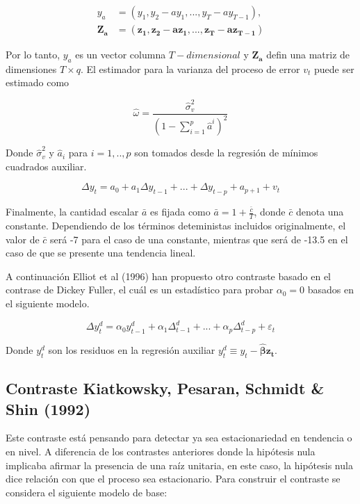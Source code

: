 \documentclass[12pt, twoside]{book}\usepackage[]{graphicx}\usepackage[]{color}
\numberwithin{equation}{section}
\numberwithin{theorem}{section}
\numberwithin{teorema}{section}
\numberwithin{defi}{section}
\numberwithin{prop}{section}
\numberwithin{defi}{section}
\theoremstyle{plain}
\begin{document}
\begin{align}
y_{a} & = (y_{1}, y_{2}-a y_{1},...,y_{T}-ay_{T-1}), \\
\boldsymbol{Z_{a}} & = (\boldsymbol{z_{1},z_{2}-a z_{1},..., z_{T}-a z_{T-1}})
\end{align}

Por lo tanto, $y_{a}$ es un vector columna $T-dimensional$ y $\boldsymbol{Z_{a}}$ defin una matriz de dimensiones $T\times q$. El estimador para la varianza del proceso de error $v_{t}$ puede ser estimado como 

\begin{equation}
\hat{\omega} = \frac{\hat{\sigma}^{2}_{v}}{(1-\sum_{i=1}^{p}\hat{a}^{i})^{2}}
\end{equation}

Donde $\hat{\sigma}^{2}_{v}$ y $\hat{a}_{i}$ para $i=1,..,p$ son tomados desde la regresión de mínimos cuadrados auxiliar. 

\begin{equation}
\Delta y_{t} = a_{0}+a_{1}\Delta y_{t-1}+...+\Delta y_{t-p}+a_{p+1}+v_{t}
\end{equation}

Finalmente, la cantidad escalar $\bar{a}$ es fijada como $\bar{a}=1+\frac{\bar{c}}{T}$, donde $\bar{c}$ denota una constante. Dependiendo de los términos deteministas incluidos originalmente, el valor de $\bar{c}$ será -7 para el caso de una constante, mientras que será de -13.5 en el caso de que se presente una tendencia lineal. 

A continuación Elliot et al (1996) han propuesto otro contraste basado en el contrase de Dickey Fuller, el cuál es un estadístico para probar $\alpha_{0}=0$ basados en el siguiente modelo. 

\begin{equation}
\Delta y_{t}^{d} = \alpha_{0}y_{t-1}^{d}+\alpha_{1}\Delta _{t-1}^{d}+...+\alpha_{p}\Delta _{t-p}^{d}+\varepsilon_{t}
\end{equation}

Donde $y_{t}^{d}$ son los residuos en la regresión auxiliar $y_{t}^{d}\equiv y_{t}-\boldsymbol{\hat{\beta}z_{t}}.$  

\subsection{Contraste Kiatkowsky, Pesaran, Schmidt \& Shin (1992)}

Este contraste está pensando para detectar ya sea estacionariedad en tendencia o en nivel. A diferencia de los contrastes anteriores donde la hipótesis nula implicaba afirmar la presencia de una raíz unitaria, en este caso, la hipótesis nula dice relación con que el proceso sea estacionario. Para construir el contraste se considera el siguiente modelo de base: 
\end{document}
